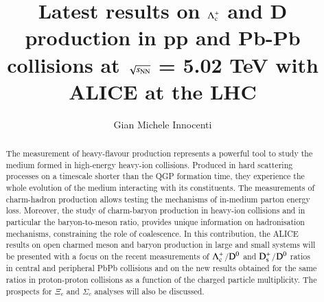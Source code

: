 \documentclass[3p,times,procedia]{elsarticle}
\newcommand{\sqrtsNN}{\sqrt{s_{\rm NN}}}
\newcommand{\Dzero}{{\rm D^0}}
\newcommand{\Ds}{{\rm D_{s}^+}}
\newcommand{\Lc}{{\rm \Lambda_{c}^+}}
\begin{document}
\begin{frontmatter}




\title{Latest results on $\Lc$ and D production in pp and Pb-Pb collisions at $\sqrtsNN$ = 5.02 TeV with ALICE at the LHC}


\author{Gian Michele Innocenti}

\address{CERN, Espl. des Particules 1, 1211 Meyrin, Switzerland}

\begin{abstract}
The measurement of heavy-flavour production represents a powerful tool to study the medium formed in high-energy 
heavy-ion collisions. Produced in hard scattering processes on a timescale shorter than the QGP formation time, 
they experience the whole evolution of the medium interacting with its constituents. The measurements of charm-hadron 
production allows testing the mechanisms of in-medium parton energy loss. Moreover, the study of charm-baryon 
production in heavy-ion collisions and in particular the baryon-to-meson ratio, provides unique information on 
hadronisation mechanisms, constraining the role of coalescence.
In this contribution, the ALICE results on open charmed meson and baryon production in large and small systems will be presented
with a focus on the recent measurements of $\Lc$/$\Dzero$ and $\Ds$/$\Dzero$ ratios in central and peripheral PbPb collisions 
and on the new results obtained for the same ratios in proton-proton collisions as a function of the charged particle multiplicity.
The prospects for $\Xi_{c}$ and $\Sigma_{c}$ analyses will also be discussed.
\end{abstract}


\end{frontmatter}
\end{document}
